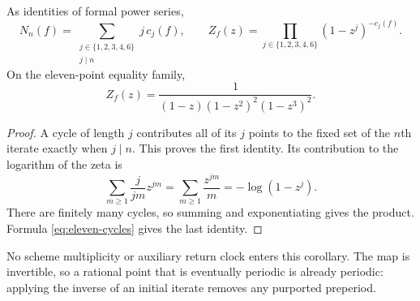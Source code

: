 \begin{corollary}
\label{cor:zeta}
As identities of formal power series,
\[
 N_n(f)=\sum_{\substack{j\in\{1,2,3,4,6\}\\j\mid n}}j\,c_j(f),
 \qquad
 Z_f(z)=\prod_{j\in\{1,2,3,4,6\}}(1-z^j)^{-c_j(f)}.
\]
On the eleven-point equality family,
\[
 Z_f(z)=\frac{1}{(1-z)(1-z^2)^2(1-z^3)^2}.
\]
\end{corollary}
\begin{proof}
A cycle of length $j$ contributes all of its $j$ points to the
fixed set of the $n$th iterate exactly when $j\mid n$.
This proves the first identity. Its contribution to the logarithm
of the zeta is
\[
 \sum_{m\ge1}\frac{j}{jm}z^{jm}
 =\sum_{m\ge1}\frac{z^{jm}}m=-\log(1-z^j).
\]
There are finitely many cycles, so summing and exponentiating gives
the product. Formula \eqref{eq:eleven-cycles} gives the last identity.
\end{proof}

No scheme multiplicity or auxiliary return clock enters this
corollary. The map is invertible, so a rational point that is
eventually periodic is already periodic: applying the inverse
of an initial iterate removes any purported preperiod.
